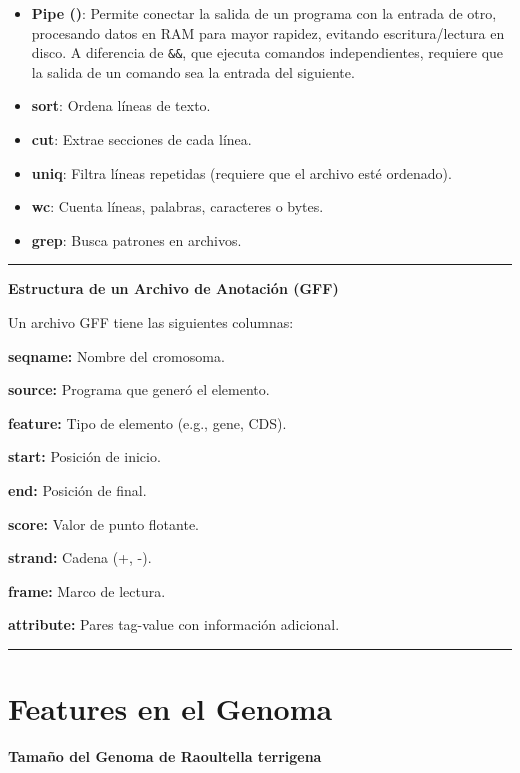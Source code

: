\documentclass[
]{book}
\begin{document}
\begin{itemize}
\item
  \textbf{Pipe (\texttt{\textbar{}})}: Permite conectar la salida de un programa con la entrada de otro, procesando datos en RAM para mayor rapidez, evitando escritura/lectura en disco. A diferencia de \texttt{\&\&}, que ejecuta comandos independientes, \texttt{\textbar{}} requiere que la salida de un comando sea la entrada del siguiente.
\item
  \textbf{sort}: Ordena líneas de texto.
\item
  \textbf{cut}: Extrae secciones de cada línea.
\item
  \textbf{uniq}: Filtra líneas repetidas (requiere que el archivo esté ordenado).
\item
  \textbf{wc}: Cuenta líneas, palabras, caracteres o bytes.
\item
  \textbf{grep}: Busca patrones en archivos.
\end{itemize}

\begin{center}\rule{0.5\linewidth}{0.5pt}\end{center}

\textbf{Estructura de un Archivo de Anotación (GFF)}

Un archivo GFF tiene las siguientes columnas:

\textbf{seqname:} Nombre del cromosoma.

\textbf{source:} Programa que generó el elemento.

\textbf{feature:} Tipo de elemento (e.g., gene, CDS).

\textbf{start:} Posición de inicio.

\textbf{end:} Posición de final.

\textbf{score:} Valor de punto flotante.

\textbf{strand:} Cadena (+, -).

\textbf{frame:} Marco de lectura.

\textbf{attribute:} Pares tag-value con información adicional.

\begin{center}\rule{0.5\linewidth}{0.5pt}\end{center}

\section{Features en el Genoma}\label{features-en-el-genoma}

\textbf{Tamaño del Genoma de Raoultella terrigena}
\end{document}
